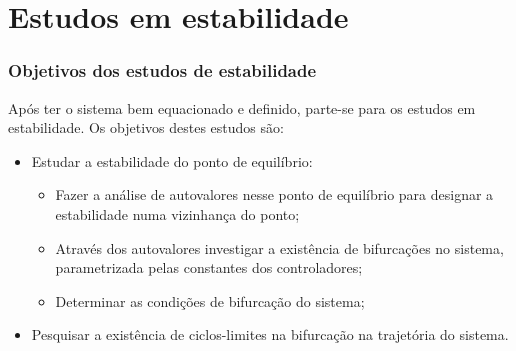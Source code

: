 \documentclass[10pt, compress,xcolor={svgnames,dvipsnames,x11names}]{beamer}
\begin{document}
\section{Estudos em estabilidade} %
\begin{frame}%
\frametitle{Objetivos dos estudos de estabilidade}
\scriptsize

	Após ter o sistema bem equacionado e definido, parte-se para os estudos em estabilidade. Os objetivos destes estudos são:

\begin{itemize}
	\item Estudar a estabilidade do ponto de equilíbrio:
	\begin{itemize}\scriptsize
		\item Fazer a análise de autovalores nesse ponto de equilíbrio para designar a estabilidade numa vizinhança do ponto;
		\item Através dos autovalores investigar a existência de bifurcações no sistema, parametrizada pelas constantes dos controladores;
		\item Determinar as condições de bifurcação do sistema;
	\end{itemize}
	\item Pesquisar a existência de ciclos-limites na bifurcação na trajetória do sistema.
\end{itemize}

\normalsize
\end{frame}%
\end{document}

